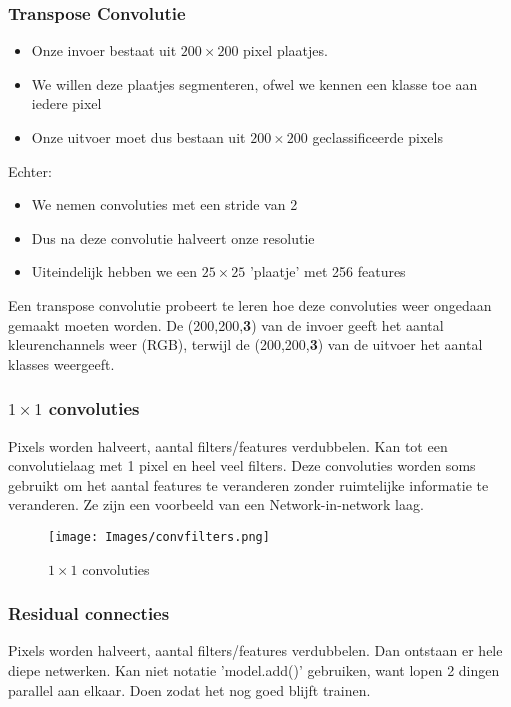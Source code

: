 {\subsubsection{Transpose Convolutie}
\begin{itemize}
    \item Onze invoer bestaat uit $200\times 200$ pixel plaatjes.
    \item We willen deze plaatjes segmenteren, ofwel we kennen een klasse toe aan iedere pixel
    \item Onze uitvoer moet dus bestaan uit $200\times 200$ geclassificeerde pixels
\end{itemize}
Echter:
\begin{itemize}
    \item We nemen convoluties met een stride van 2
    \item Dus na deze convolutie halveert onze resolutie
    \item Uiteindelijk hebben we een $25 \times 25$ 'plaatje' met 256 features
\end{itemize}
Een transpose convolutie probeert te leren hoe deze convoluties weer ongedaan gemaakt moeten worden. De (200,200,\textbf{3}) van de invoer geeft het aantal kleurenchannels weer (RGB), terwijl de (200,200,\textbf{3}) van de uitvoer het aantal klasses weergeeft.

\subsubsection{$1\times 1$ convoluties}
Pixels worden halveert, aantal filters/features verdubbelen. Kan tot een convolutielaag met 1 pixel en heel veel filters. Deze convoluties worden soms gebruikt om het aantal features te veranderen zonder ruimtelijke informatie te veranderen. Ze zijn een voorbeeld van een Network-in-network laag.
\begin{figure}[h!]
    \centering
    \texttt{[image: Images/convfilters.png]}
    \caption{$1\times 1$ convoluties}
    \label{fig:filters}
\end{figure}

\subsubsection{Residual connecties}
Pixels worden halveert, aantal filters/features verdubbelen. Dan ontstaan er hele diepe netwerken. Kan niet notatie 'model.add()' gebruiken, want lopen 2 dingen parallel aan elkaar. Doen zodat het nog goed blijft trainen.

}

